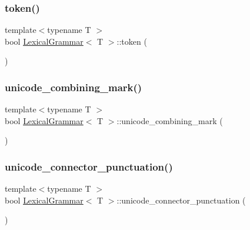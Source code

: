 \mbox{\label{class_lexical_grammar_ac728c2390815a0710dcf393763771f2c}} 
\subsubsection{\texorpdfstring{token()}{token()}}
{\footnotesize\ttfamily template$<$typename T $>$ \\
bool \hyperlink{class_lexical_grammar}{Lexical\+Grammar}$<$ T $>$\+::token (\begin{DoxyParamCaption}{ }\end{DoxyParamCaption})\hspace{0.3cm}{\ttfamily [inline]}}

\mbox{\label{class_lexical_grammar_ab16506f8bcae0aa05d7f6971d0355d9c}} 
\subsubsection{\texorpdfstring{unicode\+\_\+combining\+\_\+mark()}{unicode\_combining\_mark()}}
{\footnotesize\ttfamily template$<$typename T $>$ \\
bool \hyperlink{class_lexical_grammar}{Lexical\+Grammar}$<$ T $>$\+::unicode\+\_\+combining\+\_\+mark (\begin{DoxyParamCaption}{ }\end{DoxyParamCaption})\hspace{0.3cm}{\ttfamily [inline]}}

\mbox{\label{class_lexical_grammar_a632307d996a33ac3089d53068ba9c21d}} 
\subsubsection{\texorpdfstring{unicode\+\_\+connector\+\_\+punctuation()}{unicode\_connector\_punctuation()}}
{\footnotesize\ttfamily template$<$typename T $>$ \\
bool \hyperlink{class_lexical_grammar}{Lexical\+Grammar}$<$ T $>$\+::unicode\+\_\+connector\+\_\+punctuation (\begin{DoxyParamCaption}{ }\end{DoxyParamCaption})\hspace{0.3cm}{\ttfamily [inline]}}

